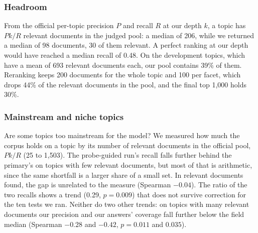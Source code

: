 \documentclass[sigconf,nonacm]{acmart}
\begin{document}
\subsubsection{Headroom}
From the official per-topic precision $P$ and recall $R$ at our depth $k$, a topic
has $Pk/R$ relevant documents in the judged pool: a median of 206, while we returned
a median of 98 documents, 30 of them relevant. A perfect ranking at our depth would
have reached a median recall of 0.48. On the development topics, which have a mean
of 693 relevant documents each, our pool contains 39\% of them. Reranking keeps 200
documents for the whole topic and 100 per facet, which drops 44\% of the relevant
documents in the pool, and the final top 1,000 holds 30\%.

\subsubsection{Mainstream and niche topics}
Are some topics too mainstream for the model? We measured how much the corpus holds
on a topic by its number of relevant documents in the official pool, $Pk/R$ (25 to
1,503). The probe-guided run's recall falls further behind the primary's on topics
with few relevant documents, but most of that is arithmetic, since the same shortfall
is a larger share of a small set. In relevant documents found, the gap is unrelated
to the measure (Spearman $-0.04$). The ratio of the two recalls shows a trend (0.29,
$p = 0.009$) that does not survive correction for the ten tests we ran. Neither do
two other trends: on topics with many relevant documents our precision and our
answers' coverage fall further below the field median (Spearman $-0.28$ and $-0.42$,
$p = 0.011$ and $0.035$).
\end{document}
